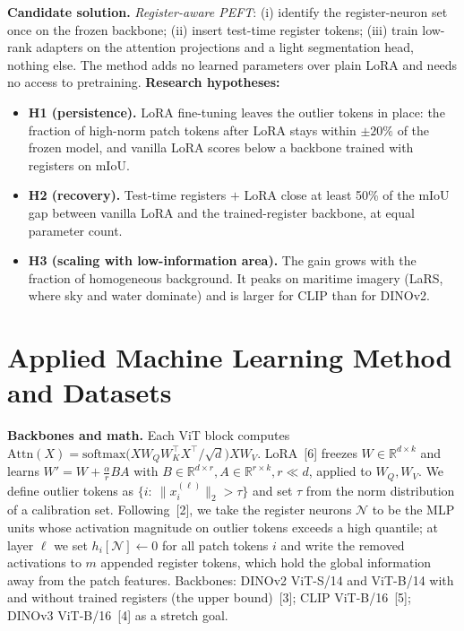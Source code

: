 \documentclass[10pt]{article}
\begin{document}
\textbf{Candidate solution.} \emph{Register-aware PEFT}: (i) identify the register-neuron set once on the frozen backbone; (ii) insert test-time register tokens; (iii) train low-rank adapters on the attention projections and a light segmentation head, nothing else. The method adds no learned parameters over plain LoRA and needs no access to pretraining. \textbf{Research hypotheses:}
\begin{itemize}
\item \textbf{H1 (persistence).} LoRA fine-tuning leaves the outlier tokens in place: the fraction of high-norm patch tokens after LoRA stays within $\pm20\%$ of the frozen model, and vanilla LoRA scores below a backbone trained with registers on mIoU.
\item \textbf{H2 (recovery).} Test-time registers $+$ LoRA close at least 50\% of the mIoU gap between vanilla LoRA and the trained-register backbone, at equal parameter count.
\item \textbf{H3 (scaling with low-information area).} The gain grows with the fraction of homogeneous background. It peaks on maritime imagery (LaRS, where sky and water dominate) and is larger for CLIP than for DINOv2.
\end{itemize}

\section{Applied Machine Learning Method and Datasets}
\textbf{Backbones and math.} Each ViT block computes $\mathrm{Attn}(X)=\mathrm{softmax}\!\big(XW_Q W_K^{\!\top}X^{\!\top}/\sqrt{d}\big)XW_V$. LoRA~[6] freezes $W\in\mathbb{R}^{d\times k}$ and learns $W' = W + \tfrac{\alpha}{r}BA$ with $B\in\mathbb{R}^{d\times r}, A\in\mathbb{R}^{r\times k}, r\ll d$, applied to $W_Q,W_V$. We define outlier tokens as $\{i:\ \|x_i^{(\ell)}\|_2>\tau\}$ and set $\tau$ from the norm distribution of a calibration set. Following~[2], we take the register neurons $\mathcal{N}$ to be the MLP units whose activation magnitude on outlier tokens exceeds a high quantile; at layer $\ell$ we set $h_i[\mathcal{N}]\leftarrow 0$ for all patch tokens $i$ and write the removed activations to $m$ appended register tokens, which hold the global information away from the patch features. Backbones: DINOv2 ViT-S/14 and ViT-B/14 with and without trained registers (the upper bound)~[3]; CLIP ViT-B/16~[5]; DINOv3 ViT-B/16~[4] as a stretch goal.
\end{document}
